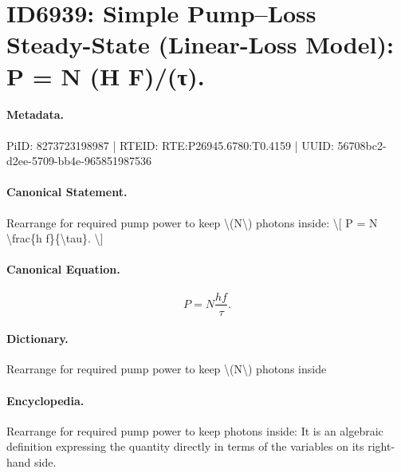 \section*{ID6939: Simple Pump–Loss Steady-State (Linear-Loss Model): P = N (H F)/(τ).}
\paragraph{Metadata.}
PiID: 8273723198987 | RTEID: RTE:P26945.6780:T0.4159 | UUID: 56708bc2-d2ee-5709-bb4e-965851987536

\paragraph{Canonical Statement.}
Rearrange for required pump power to keep \textbackslash{}(N\textbackslash{}) photons inside: \textbackslash{}[ P = N \textbackslash{}frac\{h f\}\{\textbackslash{}tau\}. \textbackslash{}]

\paragraph{Canonical Equation.}
\[
P = N \frac{h f}{\tau}.
\]

\paragraph{Dictionary.}
Rearrange for required pump power to keep \textbackslash{}(N\textbackslash{}) photons inside

\paragraph{Encyclopedia.}
Rearrange for required pump power to keep photons inside: It is an algebraic definition expressing the quantity directly in terms of the variables on its right-hand side.
